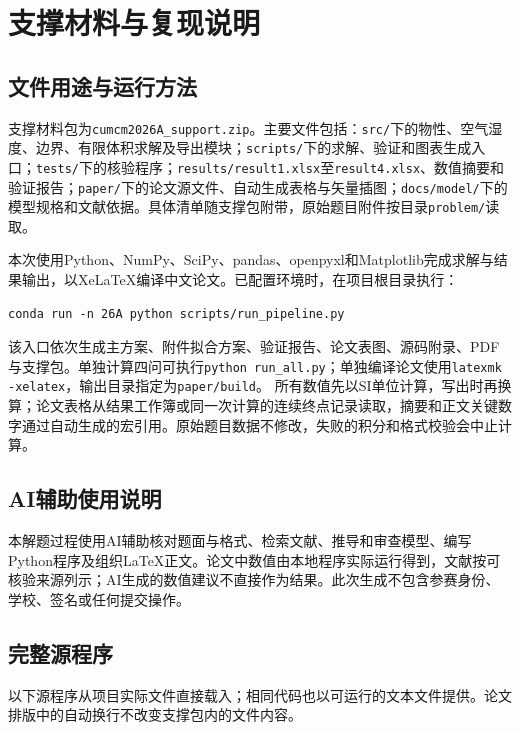 \section{支撑材料与复现说明}
\subsection{文件用途与运行方法}
支撑材料包为\texttt{cumcm2026A\_support.zip}。主要文件包括：\texttt{src/}下的物性、空气湿度、边界、有限体积求解及导出模块；\texttt{scripts/}下的求解、验证和图表生成入口；\texttt{tests/}下的核验程序；\texttt{results/result1.xlsx}至\texttt{result4.xlsx}、数值摘要和验证报告；\texttt{paper/}下的论文源文件、自动生成表格与矢量插图；\texttt{docs/model/}下的模型规格和文献依据。具体清单随支撑包附带，原始题目附件按目录\texttt{problem/}读取。

本次使用Python、NumPy、SciPy、pandas、openpyxl和Matplotlib完成求解与结果输出，以XeLaTeX编译中文论文。已配置环境时，在项目根目录执行：
\begin{lstlisting}[language={},numbers=none]
conda run -n 26A python scripts/run_pipeline.py
\end{lstlisting}
该入口依次生成主方案、附件拟合方案、验证报告、论文表图、源码附录、PDF与支撑包。单独计算四问可执行\texttt{python run\_all.py}；单独编译论文使用\texttt{latexmk -xelatex}，输出目录指定为\texttt{paper/build}。
所有数值先以SI单位计算，写出时再换算；论文表格从结果工作簿或同一次计算的连续终点记录读取，摘要和正文关键数字通过自动生成的宏引用。原始题目数据不修改，失败的积分和格式校验会中止计算。

\subsection{AI辅助使用说明}
本解题过程使用AI辅助核对题面与格式、检索文献、推导和审查模型、编写Python程序及组织LaTeX正文。论文中数值由本地程序实际运行得到，文献按可核验来源列示；AI生成的数值建议不直接作为结果。此次生成不包含参赛身份、学校、签名或任何提交操作。

\subsection{完整源程序}
以下源程序从项目实际文件直接载入；相同代码也以可运行的文本文件提供。论文排版中的自动换行不改变支撑包内的文件内容。

